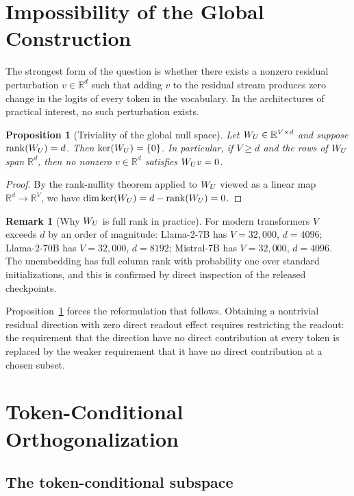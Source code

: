 \documentclass[11pt,letterpaper]{article}
\theoremstyle{plain}
\newtheorem{proposition}[theorem]{Proposition}
\theoremstyle{definition}
\newtheorem{remark}[theorem]{Remark}
\DeclareMathOperator{\rank}{rank}
\newcommand{\R}{\mathbb{R}}
\newcommand{\1}{\mathbf{1}}
\newcommand{\WU}{W_{U}\mathchoice{}{}{}{}}
\begin{document}
\section{Impossibility of the Global Construction}\label{sec:impossibility}

The strongest form of the question is whether there exists a nonzero residual perturbation $v \in \R^d$ such that adding $v$ to the residual stream produces zero change in the logits of every token in the vocabulary. In the architectures of practical interest, no such perturbation exists.

\begin{proposition}[Triviality of the global null space]\label{prop:triv}
Let $\WU \in \R^{V \times d}$ and suppose $\rank(\WU) = d$. Then $\ker(\WU) = \{0\}$. In particular, if $V \geq d$ and the rows of $\WU$ span $\R^d$, then no nonzero $v \in \R^d$ satisfies $\WU v = 0$.
\end{proposition}

\begin{proof}
By the rank-nullity theorem applied to $\WU$ viewed as a linear map $\R^d \to \R^V$, we have $\dim \ker(\WU) = d - \rank(\WU) = 0$.
\end{proof}

\begin{remark}[Why $\WU$ is full rank in practice]
For modern transformers $V$ exceeds $d$ by an order of magnitude: Llama-2-7B has $V = 32{,}000$, $d = 4096$; Llama-2-70B has $V = 32{,}000$, $d = 8192$; Mistral-7B has $V = 32{,}000$, $d = 4096$. The unembedding has full column rank with probability one over standard initializations, and this is confirmed by direct inspection of the released checkpoints.
\end{remark}

Proposition~\ref{prop:triv} forces the reformulation that follows. Obtaining a nontrivial residual direction with zero direct readout effect requires restricting the readout: the requirement that the direction have no direct contribution at every token is replaced by the weaker requirement that it have no direct contribution at a chosen subset.

\section{Token-Conditional Orthogonalization}\label{sec:conditional}

\subsection{The token-conditional subspace}
\end{document}
